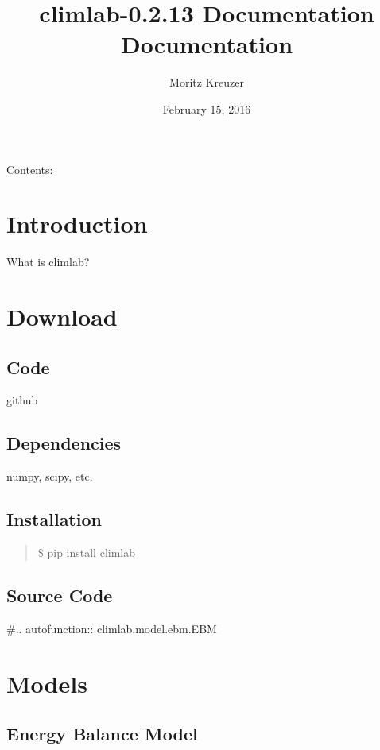 \documentclass[letterpaper,10pt,english]{sphinxmanual}
\title{climlab-0.2.13 Documentation Documentation}
\date{February 15, 2016}
\author{Moritz Kreuzer}
\begin{document}
\maketitle
\tableofcontents
{}\label{index::doc}


Contents:


\chapter{Introduction}
\label{intro:introduction}\label{intro::doc}\label{intro:welcome-to-the-climlab-documentation}
What is climlab?


\chapter{Download}
\label{download:download}\label{download::doc}

\section{Code}
\label{download:code}
github


\section{Dependencies}
\label{download:dependencies}
numpy, scipy, etc.


\section{Installation}
\label{download:installation}\begin{quote}

\$ pip install climlab
\end{quote}


\section{Source Code}
\label{download:source-code}
\#.. autofunction:: climlab.model.ebm.EBM


\chapter{Models}
\label{models:models}\label{models::doc}

\section{Energy Balance Model}
\label{models:energy-balance-model}
\end{document}
